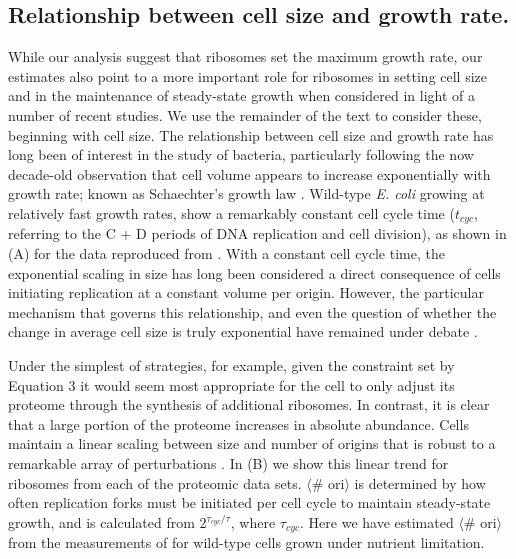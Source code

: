 \subsection{Relationship between cell size and growth rate.}

While our analysis suggest that ribosomes set the maximum growth rate,  our
estimates also point to a more important role for ribosomes in setting  cell
size and in the maintenance of steady-state growth  when considered in light of
a number of recent studies.  We use the remainder of the text to consider these,
beginning with cell size. The relationship between cell size and growth rate has
long been of interest in the study of bacteria, particularly following the now
decade-old observation that cell volume appears to increase exponentially with
growth rate; known as Schaechter's growth law  \citep{schaechter1958,
taheriaraghi2015}. Wild-type \textit{E. coli} growing at relatively fast growth
rates, show a remarkably constant cell cycle time ($t_{cyc}$, referring to the C
+ D periods of DNA replication and cell division), as shown in
(A) for the data reproduced from \citep{si2017}.
With a constant cell cycle time, the exponential scaling in size has long been
considered a direct consequence of cells initiating replication at a constant
volume per origin. However, the particular mechanism that governs this
relationship, and even the question of whether the change in average cell size
is truly exponential  have remained under debate \citep{si2017, harris2018}.

Under the simplest of strategies, for example, given the constraint set by
Equation 3 it would seem most appropriate for the cell to only adjust its
proteome through the synthesis of additional ribosomes. In contrast, it is clear
that a large portion of the proteome increases in absolute abundance. Cells
maintain a linear scaling between size and number of origins that is robust to a
remarkable array of perturbations \citep{si2017}. In
(B) we show this linear trend for ribosomes  from
each of the  proteomic data sets.  $\langle$\# ori$\rangle$ is determined by how
often replication forks must be initiated per cell cycle to maintain
steady-state growth, and is calculated from 2$^{\tau_{cyc} / \tau}$, where
$\tau_{cyc}$. Here we have estimated $\langle$\# ori$\rangle$ from the
measurements of \cite{si2017} for wild-type cells grown under nutrient
limitation.

